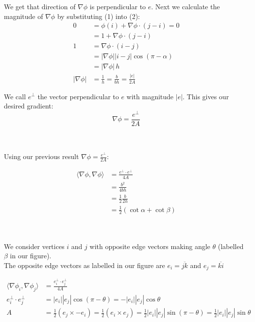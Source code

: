 \documentclass{article}
\newcommand\ifrac[2]{{\displaystyle\frac{#1}{#2}}}
\def\grad{\nabla}
\def\hal{\ifrac{1}{2}}
\begin{document}
We get that direction of $\grad \phi$ is perpendicular to $e$. Next we calculate the magnitude of $\grad \phi$
by substituting (1) into (2):
\begin{align*}
    0 &= \phi(i) + \grad \phi \cdot (j - i) = 0 \\
        &= 1 + \grad \phi \cdot (j - i) \\
    1 &=  \grad \phi \cdot (i - j) \\
        &= |\grad \phi| |i - j| \cos(\pi - \alpha) \\
        &= |\grad \phi| \, h \\
    |\grad \phi| &= \frac{1}{h} = \frac{b}{bh} = \frac{|e|}{2A}
\end{align*}

We call $e^\perp$ the vector perpendicular to $e$ with magnitude $|e|$. This gives our desired gradient:
$$
    \grad \phi = \frac{e^\perp}{2A}
$$


\vspace{1.8cm}
\\\\


Using our previous result $\grad \phi = \ifrac{e^\perp}{2A}$:

\begin{align*}
    \langle \grad \phi, \grad \phi \rangle &= \frac{e^\perp \cdot e^\perp}{4A} \\
        &= \frac{b^2}{4bh} \\
        &= \hal \frac{b}{2h} \\
        &= \hal (\cot\alpha + \cot\beta)
\end{align*}


\vspace{1.8cm}
\\\\


We consider vertices $i$ and $j$ with opposite edge vectors making angle $\theta$ (labelled $\beta$ in our figure).\\
The opposite edge vectors as labelled in our figure are $e_i = \overline{jk}$ and $e_j = \overline{ki}$

\begin{align*}
    \langle \grad \phi_i, \grad \phi_j \rangle &= \frac{e^\perp_i \cdot e^\perp_j}{4A} \\
    e^\perp_i \cdot e^\perp_j &= |e_i| |e_j| \cos(\pi - \theta) = -|e_i| |e_j| \cos\theta \\
    A &= \hal (e_j \times -e_i) = \hal (e_i \times e_j) = \hal |e_i| |e_j| \sin(\pi - \theta) = \hal |e_i| |e_j| \sin\theta \\
\end{align*}
\end{document}
